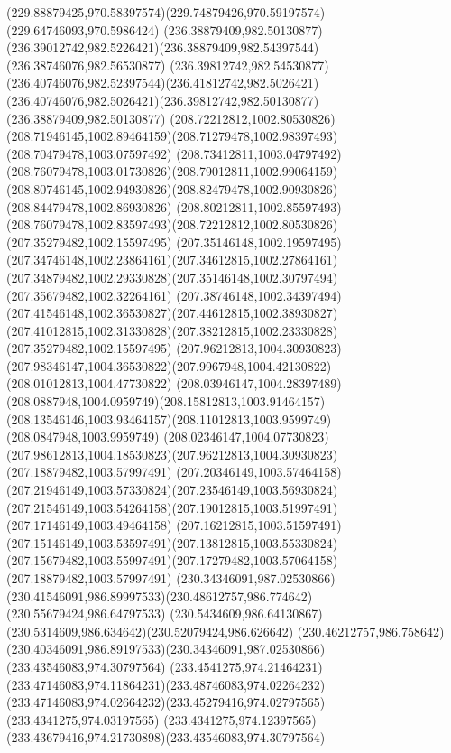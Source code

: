 {{		\curveto(229.88879425,970.58397574)(229.74879426,970.59197574)(229.64746093,970.5986424)
		\moveto(236.38879409,982.50130877)
		\curveto(236.39012742,982.5226421)(236.38879409,982.54397544)(236.38746076,982.56530877)
		\curveto(236.39812742,982.54530877)(236.40746076,982.52397544)(236.41812742,982.5026421)
		\curveto(236.40746076,982.5026421)(236.39812742,982.50130877)(236.38879409,982.50130877)
		\moveto(208.72212812,1002.80530826)
		\curveto(208.71946145,1002.89464159)(208.71279478,1002.98397493)(208.70479478,1003.07597492)
		\curveto(208.73412811,1003.04797492)(208.76079478,1003.01730826)(208.79012811,1002.99064159)
		\curveto(208.80746145,1002.94930826)(208.82479478,1002.90930826)(208.84479478,1002.86930826)
		\curveto(208.80212811,1002.85597493)(208.76079478,1002.83597493)(208.72212812,1002.80530826)
		\moveto(207.35279482,1002.15597495)
		\curveto(207.35146148,1002.19597495)(207.34746148,1002.23864161)(207.34612815,1002.27864161)
		\curveto(207.34879482,1002.29330828)(207.35146148,1002.30797494)(207.35679482,1002.32264161)
		\curveto(207.38746148,1002.34397494)(207.41546148,1002.36530827)(207.44612815,1002.38930827)
		\curveto(207.41012815,1002.31330828)(207.38212815,1002.23330828)(207.35279482,1002.15597495)
		\moveto(207.96212813,1004.30930823)
		\curveto(207.98346147,1004.36530822)(207.9967948,1004.42130822)(208.01012813,1004.47730822)
		\curveto(208.03946147,1004.28397489)(208.0887948,1004.0959749)(208.15812813,1003.91464157)
		\curveto(208.13546146,1003.93464157)(208.11012813,1003.9599749)(208.0847948,1003.9959749)
		\curveto(208.02346147,1004.07730823)(207.98612813,1004.18530823)(207.96212813,1004.30930823)
		\moveto(207.18879482,1003.57997491)
		\curveto(207.20346149,1003.57464158)(207.21946149,1003.57330824)(207.23546149,1003.56930824)
		\curveto(207.21546149,1003.54264158)(207.19012815,1003.51997491)(207.17146149,1003.49464158)
		\curveto(207.16212815,1003.51597491)(207.15146149,1003.53597491)(207.13812815,1003.55330824)
		\curveto(207.15679482,1003.55997491)(207.17279482,1003.57064158)(207.18879482,1003.57997491)
		\moveto(230.34346091,987.02530866)
		\curveto(230.41546091,986.89997533)(230.48612757,986.774642)(230.55679424,986.64797533)
		\curveto(230.5434609,986.64130867)(230.5314609,986.634642)(230.52079424,986.626642)
		\curveto(230.46212757,986.758642)(230.40346091,986.89197533)(230.34346091,987.02530866)
		\moveto(233.43546083,974.30797564)
		\curveto(233.4541275,974.21464231)(233.47146083,974.11864231)(233.48746083,974.02264232)
		\curveto(233.47146083,974.02664232)(233.45279416,974.02797565)(233.4341275,974.03197565)
		\curveto(233.4341275,974.12397565)(233.43679416,974.21730898)(233.43546083,974.30797564)
}}
